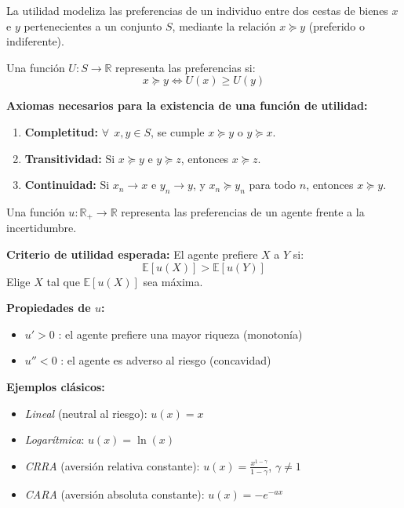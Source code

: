 \begin{f}
	La utilidad modeliza las preferencias de un individuo entre dos cestas de bienes \(x\) e \(y\) pertenecientes a un conjunto \(S\), mediante la relación \(x \succcurlyeq y\) (preferido o indiferente).
	
	Una función \(U: S \rightarrow \mathbb{R}\) representa las preferencias si:
	\[
	x \succcurlyeq y \iff U(x) \geq U(y)
	\]
	
	\textbf{Axiomas necesarios para la existencia de una función de utilidad:}
	\begin{enumerate}
		\item \textbf{Completitud:} \(\forall \ \ x, y \in S\), se cumple \(x \succcurlyeq y\) o \(y \succcurlyeq x\).
		\item \textbf{Transitividad:} Si \(x \succcurlyeq y\) e \(y \succcurlyeq z\), entonces \(x \succcurlyeq z\).
		\item \textbf{Continuidad:} Si \(x_n \to x\) e \(y_n \to y\), y \(x_n \succcurlyeq y_n\) para todo \(n\), entonces \(x \succcurlyeq y\).
	\end{enumerate}
	
\end{f}


\begin{f}
	Una función \(u : \mathbb{R}_+ \rightarrow \mathbb{R}\) representa las preferencias de un agente frente a la incertidumbre.
	
	\textbf{Criterio de utilidad esperada:} El agente prefiere \(X\) a \(Y\) si:
	\[
	\mathbb{E}[u(X)] > \mathbb{E}[u(Y)]
	\]
	Elige \(X\) tal que \(\mathbb{E}[u(X)]\) sea máxima.
	
	\textbf{Propiedades de \(u\):}
	\begin{itemize}
		\item \(u'\! > 0\) : el agente prefiere una mayor riqueza (monotonía)
		\item \(u'' < 0\) : el agente es adverso al riesgo (concavidad)
	\end{itemize}
	
	\textbf{Ejemplos clásicos:}
	\begin{itemize}
		\item \textit{Lineal} (neutral al riesgo): \(u(x) = x\)
		\item \textit{Logarítmica}: \(u(x) = \ln(x)\)
		\item \textit{CRRA} (aversión relativa constante): \(u(x) = \frac{x^{1 - \gamma}}{1 - \gamma}\), \(\gamma \ne 1\)
		\item \textit{CARA} (aversión absoluta constante): \(u(x) = -e^{-a x}\)
	\end{itemize}
	
\end{f}

